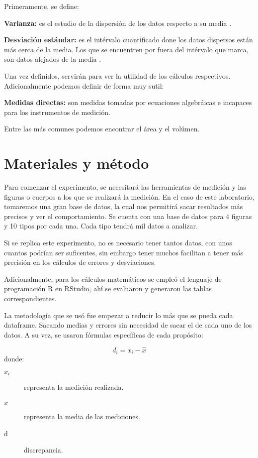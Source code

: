 \documentclass[%
 reprint,
groupedaddress,
unsortedaddress,
 amsmath,amssymb,
 aps,
superscriptaddress
]{revtex4-2}
\begin{document}
Primeramente, se define:

\textbf{Varianza: } es el estudio de la dispersión de los datos respecto a su media \cite{cervantes2008media}.

\textbf{Desviación estándar: } es el intérvalo cuantificado done los datos dispersos están más cerca de la media. Los que se encuentren por fuera del intérvalo que marca, son datos alejados de la media \cite{cervantes2008media}.

Una vez definidos, servirán para ver la utilidad de los cálculos respectivos. Adicionalmente podemos definir de forma muy sutil:

\textbf{Medidas directas: } son medidas tomadas por ecuaciones algebráicas e incapaces para los instrumentos de medición.

Entre las más comunes podemos encontrar el área y el volúmen.


\section{Materiales y método}
\label{sec:met}

Para comenzar el experimento, se necesitará las herramientas de medición y las figuras o cuerpos a los que se realizará la medición. En el caso de este laboratorio, tomaremos una gran base de datos, la cual nos permitirá sacar resultados más precisos y ver el comportamiento. Se cuenta con una base de datos para 4 figuras y 10 tipos por cada una. Cada tipo tendrá mil datos a analizar.

Si se replica este experimento, no es necesario tener tantos datos, con unos cuantos podrían ser suficentes, sin embargo tener muchos facilitan a tener más precisión en los cálculos de errores y desviaciones.

Adicionalmente, para los cálculos matemáticos se empleó el lenguaje de programación R en RStudio, ahí se evaluaron y generaron las tablas correspondientes.

La metodología que se usó fue empezar a reducir lo más que se pueda cada dataframe. Sacando medias y errores sin necesidad de sacar el de cada uno de los datos. A su vez, se usaron fórmulas específicas de cada propósito:

\begin{equation}\label{EQ:001}
	d_i = x_i - \hat{x}
\end{equation}
donde:
\begin{description}
	\item[$x_i$] representa la medición realizada.
	\item[$\hat{x}$] representa la media de las mediciones.
	\item[d] discrepancia.
\end{description}
\end{document}
